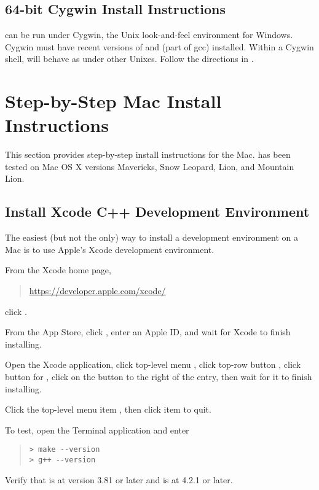 \subsection{64-bit Cygwin Install Instructions}

\CmdStan can be run under Cygwin, the Unix look-and-feel environment
for Windows.  Cygwin must have recent versions of  and
 (part of gcc) installed.  Within a Cygwin shell, \CmdStan
will behave as under other Unixes. Follow the directions in
.



\section{Step-by-Step Mac Install Instructions}\label{install-mac.appendix}

This section provides step-by-step install instructions for the Mac.
\CmdStan has been tested on Mac OS X versions Mavericks, Snow Leopard,
Lion, and Mountain Lion.

\subsection{Install Xcode C++ Development Environment}

The easiest (but not the only) way to install a \Cpp development
environment on a Mac is to use Apple's Xcode development environment.

From the Xcode home page, 
%
\begin{quote}
\url{https://developer.apple.com/xcode/}
\end{quote}
%
click .

From the App Store, click , enter an Apple ID,
and wait for Xcode to finish installing.

Open the Xcode application, click top-level menu
, click top-row button ,
click button for , click on the 
button to the right of the  entry, then
wait for it to finish installing.  

Click the top-level menu item , then click item 
 to quit.

To test, open the Terminal application and enter

\begin{quote}
\begin{Verbatim}[fontshape=sl,fontsize=\small]
> make --version
> g++ --version
\end{Verbatim}
\end{quote}
%
Verify that  is at version 3.81 or later and 
is at 4.2.1 or later.



